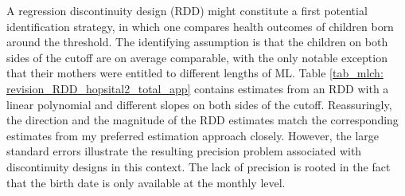 A regression discontinuity design (RDD) might constitute a first potential identification strategy, in which one compares health outcomes of children born around the threshold. The identifying assumption is that the children on both sides of the cutoff are on average comparable, with the only notable exception that their mothers were entitled to different lengths of ML. Table \ref{tab_mlch: revision_RDD_hopsital2_total_app} contains estimates from an RDD with a linear polynomial and different slopes on both sides of the cutoff. Reassuringly, the direction and the magnitude of the RDD estimates match the corresponding estimates from my preferred estimation approach closely. However, the large standard errors illustrate the resulting precision problem associated with discontinuity designs in this context. The lack of precision is rooted in the fact that the birth date is only available at the monthly level.



